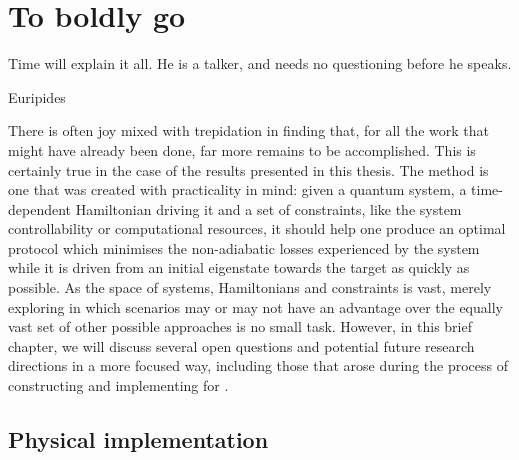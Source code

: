 \chapter{To boldly go}\label{chap:9_Future_directions}

\epigraph{Time will explain it all. He is a talker, and needs no questioning before he speaks.}{Euripides}

There is often joy mixed with trepidation in finding that, for all the work that might have already been done, far more remains to be accomplished. This is certainly true in the case of the results presented in this thesis. The  method is one that was created with practicality in mind: given a quantum system, a time-dependent Hamiltonian driving it and a set of constraints, like the system controllability or computational resources, it should help one produce an optimal protocol which minimises the non-adiabatic losses experienced by the system while it is driven from an initial eigenstate towards the target as quickly as possible. As the space of systems, Hamiltonians and constraints is vast, merely exploring in which scenarios  may or may not have an advantage over the equally vast set of other possible approaches is no small task. However, in this brief chapter, we will discuss several open questions and potential future research directions in a more focused way, including those that arose during the process of constructing and implementing  for \cite{cepaite_cold_2023}. 

\section{Physical implementation}

